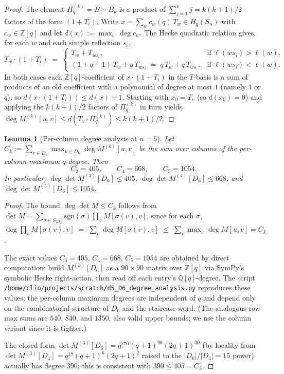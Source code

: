 \documentclass[11pt]{article}
\newtheorem{lemma}[theorem]{Lemma}
\theoremstyle{definition}
\begin{document}
\begin{proof}
The element $\Pi^{(k)}_q = B_1\cdots B_k$ is a product of
$\sum_{j=1}^k j = k(k+1)/2$ factors of the form $(1+T_i)$. Write
$x = \sum_w c_w(q)\,T_w \in H_q(S_n)$ with $c_w\in\mathbb{Z}[q]$ and let
$d(x):=\max_w \deg c_w$. The Hecke quadratic relation gives, for each $w$ and each
simple reflection $s_i$,
\[
T_w\cdot(1+T_i) \;=\;
\begin{cases}
T_w + T_{ws_i}, & \text{if } \ell(ws_i)>\ell(w),\\
(1+q-1)\,T_w + q\,T_{ws_i} \;=\; q\,T_w + q\,T_{ws_i}, & \text{if } \ell(ws_i)<\ell(w).
\end{cases}
\]
In both cases each $\mathbb{Z}[q]$-coefficient of $x\cdot(1+T_i)$ in the
$T$-basis is a sum of products of an old coefficient with a polynomial of
degree at most $1$ (namely $1$ or $q$), so $d(x\cdot(1+T_i))\leq d(x)+1$.
Starting with $x_0=T_v$ (so $d(x_0)=0$) and applying the $k(k+1)/2$ factors of
$\Pi^{(k)}_q$ in turn yields
$\deg M^{(k)}[u,v] \leq d(T_v\cdot\Pi^{(k)}_q)\leq k(k+1)/2$.
\end{proof}

\begin{lemma}[Per-column degree analysis at $n=6$]\label{lem:col-deg}
Let $C_k := \sum_{v\in D_6}\max_{u\in D_6}\deg M^{(k)}[u,v]$ be the sum over
columns of the per-column maximum $q$-degree. Then
\[
C_3 = 405,\qquad C_4 = 668,\qquad C_5 = 1054.
\]
In particular,
$\deg \det M^{(3)}[D_6]\leq 405$,
$\deg \det M^{(4)}[D_6]\leq 668$, and
$\deg \det M^{(5)}[D_6]\leq 1054$.
\end{lemma}

\begin{proof}
The bound $\deg\det M\leq C_k$ follows from
$\det M = \sum_{\sigma\in S_{|D_6|}}\mathrm{sgn}(\sigma)\prod_v M[\sigma(v),v]$,
since for each $\sigma$,
$\deg\prod_v M[\sigma(v),v] \;=\; \sum_v \deg M[\sigma(v),v] \;\leq\; \sum_v\max_u\deg M[u,v] = C_k$.

The exact values $C_3=405$, $C_4=668$, $C_5=1054$ are obtained by direct
computation: build $M^{(k)}[D_6]$ as a $90\times 90$ matrix over $\mathbb{Z}[q]$
via SymPy's symbolic Hecke right-action, then read off each entry's
$\mathbb{Q}[q]$-degree. The script
\texttt{/home/clio/projects/scratch/d5\_D6\_degree\_analysis.py} reproduces
these values; the per-column maximum degrees are independent of $q$ and depend
only on the combinatorial structure of $D_6$ and the staircase word. (The
analogous row-max sums are $540$, $840$, and $1350$, also valid upper bounds;
we use the column variant since it is tighter.)

The closed form $\det M^{(3)}[D_6]=q^{270}(q+1)^{90}(2q+1)^{30}$
(by locality from $\det M^{(3)}[D_4]=q^{18}(q+1)^6(2q+1)^2$ raised to the
$|D_6|/|D_4|=15$ power) actually has degree $390$; this is consistent with
$390\leq 405=C_3$.
\end{proof}
\end{document}
